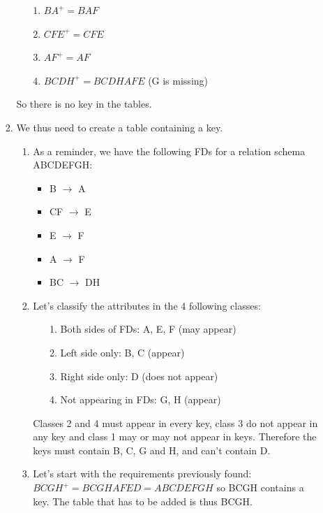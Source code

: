 \documentclass[11pt]{article}
\begin{document}
\begin{enumerate}
\begin{enumerate}
\begin{enumerate}
            \begin{itemize}
                \item [1.] $BA^+ = BAF$
                \item [2.] $CFE^+ = CFE$
                \item [3.] $AF^+ = AF$
                \item [4.] $BCDH^+ = BCDHAFE$ (G is missing)
            \end{itemize}
            So there is no key in the tables.
            \item We thus need to create a table containing a key.
            \begin{enumerate}
                \item As a reminder, we have the following FDs for a relation schema ABCDEFGH:
                    \begin{itemize}
                      \item B $\rightarrow$ A
                      \item CF $\rightarrow$ E
                      \item E $\rightarrow$ F
                      \item A $\rightarrow$ F
                      \item BC $\rightarrow$ DH
                    \end{itemize}
                \item Let's classify the attributes in the 4 following classes:
                \begin{itemize}
                    \item [1.] Both sides of FDs: A, E, F (may appear)
                    \item [2.] Left side only: B, C (appear)
                    \item [3.] Right side only: D (does not appear)
                    \item [4.] Not appearing in FDs: G, H (appear)
                \end{itemize}
                Classes 2 and 4 must appear in every key, class 3 do not appear in any key and class 1 may or may not appear in keys. 
                Therefore the keys must contain B, C, G and H, and can't contain D.
                \item Let's start with the requirements previously found:
                $BCGH^+ = BCGHAFED = ABCDEFGH$ so BCGH contains a key. The table that has to be added is thus BCGH.
            \end{enumerate}

\end{enumerate}
\end{enumerate}
\end{enumerate}
\end{document}
